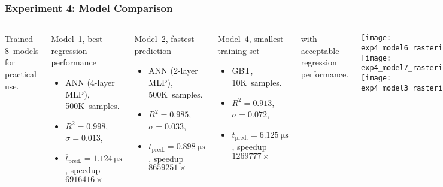 \begin{frame}
	\frametitle{Experiment 4: Model Comparison}
	\begin{columns}
		Trained \alert{8~models} for practical use.

		\begin{block}{\footnotesize Model~1, best regression performance}
			\footnotesize
			\linespread{0.6}\selectfont
			\begin{itemize}
				\item
					ANN (4-layer MLP), 500K~samples.
				\item
					$R^2=\num{0.998}$,
					$\sigma=\num{0.013}$,
				\item
					$\overline{t}_{\text{pred.}}=\SI{1.124}{\micro\second}$,
					\alert{speedup $\num{6916416} \times$}
			\end{itemize}
		\end{block}
		\vspace{-0.6em}
		\begin{block}{\footnotesize Model~2, fastest prediction\textsuperscript{\textdagger}}
			\footnotesize
			\linespread{0.6}\selectfont
			\begin{itemize}
				\item
					ANN (2-layer MLP), 500K~samples.
				\item
					$R^2=\num{0.985}$,
					$\sigma=\num{0.033}$,
				\item
					$\overline{t}_{\text{pred.}}=\SI{0.898}{\micro\second}$,
					\alert{speedup $\num{8659251} \times$}
			\end{itemize}
		\end{block}
		\vspace{-0.6em}
		\begin{block}{\footnotesize Model~4, smallest training set\textsuperscript{\textdagger}}
			\footnotesize
			\linespread{0.6}\selectfont
			\begin{itemize}
				\item
					GBT, \alert{10K~samples.}
				\item
					$R^2=\num{0.913}$,
					$\sigma=\num{0.072}$,
				\item
					$\overline{t}_{\text{pred.}}=\SI{6.125}{\micro\second}$,
					\alert{speedup $\num{1269777} \times$}
			\end{itemize}
		\end{block}
		\vspace{-0.6em}
		{\tiny
			\textsuperscript{\textdagger}
			with acceptable regression performance.
		}

		\texttt{[image: exp4\_model6\_rasterized]}\vspace{-8pt}\\
		\texttt{[image: exp4\_model7\_rasterized]}\vspace{-8pt}\\
		\texttt{[image: exp4\_model3\_rasterized]}
	\end{columns}
\end{frame}
